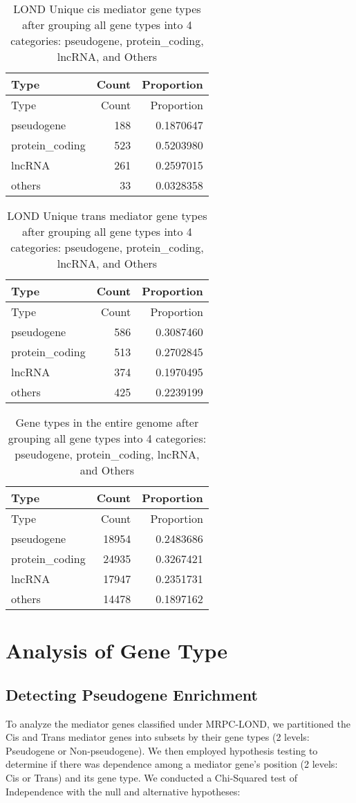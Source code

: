 \documentclass[
  12pt,
]{article}
\begin{document}
\begin{longtable}[]{@{}lrr@{}}
\caption{LOND Unique cis mediator gene types after grouping all gene
types into 4 categories: pseudogene, protein\_coding, lncRNA, and
Others}\tabularnewline
\toprule
Type & Count & Proportion\tabularnewline
\midrule
\endfirsthead
\toprule
Type & Count & Proportion\tabularnewline
\midrule
\endhead
pseudogene & 188 & 0.1870647\tabularnewline
protein\_coding & 523 & 0.5203980\tabularnewline
lncRNA & 261 & 0.2597015\tabularnewline
others & 33 & 0.0328358\tabularnewline
\bottomrule
\end{longtable}

\begin{longtable}[]{@{}lrr@{}}
\caption{LOND Unique trans mediator gene types after grouping all gene
types into 4 categories: pseudogene, protein\_coding, lncRNA, and
Others}\tabularnewline
\toprule
Type & Count & Proportion\tabularnewline
\midrule
\endfirsthead
\toprule
Type & Count & Proportion\tabularnewline
\midrule
\endhead
pseudogene & 586 & 0.3087460\tabularnewline
protein\_coding & 513 & 0.2702845\tabularnewline
lncRNA & 374 & 0.1970495\tabularnewline
others & 425 & 0.2239199\tabularnewline
\bottomrule
\end{longtable}

\begin{longtable}[]{@{}lrr@{}}
\caption{Gene types in the entire genome after grouping all gene types
into 4 categories: pseudogene, protein\_coding, lncRNA, and
Others}\tabularnewline
\toprule
Type & Count & Proportion\tabularnewline
\midrule
\endfirsthead
\toprule
Type & Count & Proportion\tabularnewline
\midrule
\endhead
pseudogene & 18954 & 0.2483686\tabularnewline
protein\_coding & 24935 & 0.3267421\tabularnewline
lncRNA & 17947 & 0.2351731\tabularnewline
others & 14478 & 0.1897162\tabularnewline
\bottomrule
\end{longtable}

\section*{Analysis of Gene Type}
\subsection*{Detecting Pseudogene Enrichment}

To analyze the mediator genes classified under MRPC-LOND, we partitioned
the Cis and Trans mediator genes into subsets by their gene types (2
levels: Pseudogene or Non-pseudogene). We then employed hypothesis
testing to determine if there was dependence among a mediator gene's
position (2 levels: Cis or Trans) and its gene type. We conducted a
Chi-Squared test of Independence with the null and alternative
hypotheses:
\end{document}
